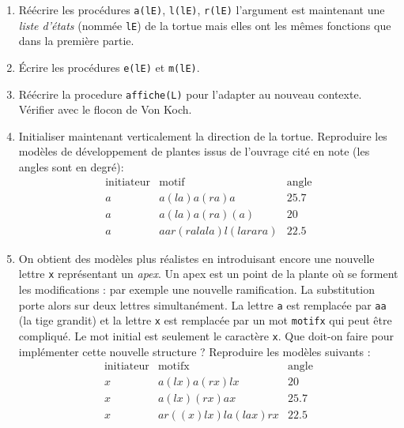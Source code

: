 \begin{enumerate}
 \item Réécrire les procédures \verb|a(lE)|, \verb|l(lE)|, \verb|r(lE)| l'argument est maintenant une \emph{liste d'états} (nommée \verb|lE|) de la tortue mais elles ont les mêmes fonctions que dans la première partie.
\item \'Ecrire les procédures \verb|e(lE)| et \verb|m(lE)|.
\item Réécrire la procedure \verb|affiche(L)| pour l'adapter au nouveau contexte.\\Vérifier avec le flocon de Von Koch.
\item Initialiser maintenant verticalement la direction de la tortue. Reproduire les modèles de développement de plantes issus de l'ouvrage cité en note (les angles sont en degré):
\begin{displaymath}
\renewcommand{\arraystretch}{1.2}
\begin{array}{l|l|l}
\text{initiateur} & \text{motif} & \text{angle} \\ \hline
a & a(la)a(ra)a & 25.7 \\ 
a & a(la)a(ra)(a) & 20 \\ 
a & aar(ralala)l(larara) & 22.5
\end{array}
\end{displaymath}
\item On obtient des modèles plus réalistes en introduisant encore une nouvelle lettre \verb|x| représentant un \emph{apex}. Un apex est un point de la plante où se forment les modifications : par exemple une nouvelle ramification. La substitution porte alors sur deux lettres simultanément. La lettre \verb|a| est remplacée par \verb|aa| (la tige grandit) et la lettre \verb|x| est remplacée par un mot \verb|motifx| qui peut être compliqué. Le mot initial est seulement le caractère \verb|x|. \newline
Que doit-on faire pour implémenter cette nouvelle structure ?\newline
Reproduire les modèles suivants :
\begin{displaymath}
\renewcommand{\arraystretch}{1.2}
\begin{array}{l|l|l}
\text{initiateur} & \text{motifx} & \text{angle} \\ \hline
x & a(lx)a(rx)lx & 20 \\ 
x & a(lx)(rx)ax & 25.7 \\ 
x & ar((x)lx)la(lax)rx & 22.5
\end{array}
\end{displaymath}


\end{enumerate}
